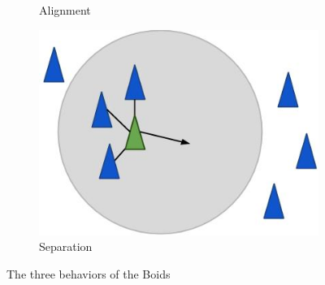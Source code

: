 \begin{figure}[h]
\begin{subfigure}[b]{0.23\textwidth}
        \caption{Alignment}
        \label{fig:boid_ali}
    \end{subfigure}
    \hfill
    \begin{subfigure}[b]{0.3\textwidth}
        \centering
        \includegraphics[width=\textwidth]{images/boid_separation}
        \caption{Separation}
        \label{fig:boid_sep}
    \end{subfigure}
    \caption[Boids behavior]{The three behaviors of the Boids}
    \label{fig:boidbehavior}
\end{figure}


%

